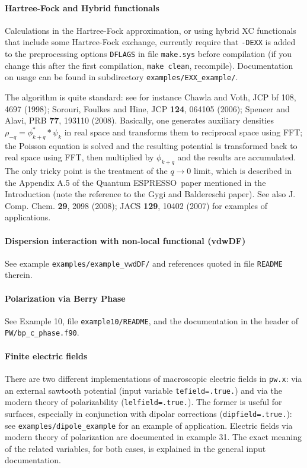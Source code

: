 \documentclass[12pt,a4paper]{article}
\def\qe{{\sc Quantum ESPRESSO}}
\def\pw.x{\texttt{pw.x}}
\begin{document}
\paragraph{Hartree-Fock and Hybrid functionals}

Calculations in the Hartree-Fock approximation, or using hybrid XC functionals 
that include some Hartree-Fock exchange, currently require that
\texttt{-DEXX} is added to the preprocessing options \texttt{DFLAGS} in file 
\texttt{make.sys} before compilation (if you change this after the first
compilation, \texttt{make clean}, recompile). 
Documentation on usage can be found in subdirectory 
\texttt{examples/EXX\_example/}.

The algorithm is quite standard: see for instance Chawla and Voth, 
JCP {bf 108}, 4697 (1998); Sorouri, Foulkes and Hine, JCP {\bf 124}, 
064105 (2006); Spencer and Alavi, PRB {\bf 77}, 193110 (2008). 
Basically, one generates auxiliary densities $\rho_{-q}=\phi^{*}_{k+q}*\psi_k$
in real space and transforms them to reciprocal space using FFT;
the Poisson equation is solved and the resulting potential is transformed 
back to real space using FFT, then multiplied by $\phi_{k+q}$ and the
results are accumulated.
The only tricky point is the treatment of the $q\rightarrow 0$ limit,
which is described in the Appendix A.5 of the \qe\ paper mentioned 
in the Introduction (note the reference to the Gygi and Baldereschi paper). 
See also J. Comp. Chem. {\bf 29}, 2098 (2008);
JACS {\bf 129}, 10402 (2007) for examples of applications.

\paragraph{Dispersion interaction with non-local functional (vdwDF)}
See example \texttt{examples/example\_vwdDF/} and references
quoted in file \texttt{README} therein.

\paragraph{Polarization via Berry Phase}
See Example 10, file \texttt{example10/README}, and the documentation 
in the header of \texttt{PW/bp\_c\_phase.f90}. 

\paragraph{Finite electric fields}
There are two different implementations of macroscopic electric fields
in \pw.x: via an external sawtooth potential (input variable
\texttt{tefield=.true.}) and via the modern theory of polarizability
(\texttt{lelfield=.true.}).
The former is useful for surfaces, especially in conjunction
with dipolar corrections (\texttt{dipfield=.true.}):
see \texttt{examples/dipole\_example} for an example of application. 
Electric fields via modern theory of polarization are documented in
example 31. The exact meaning of the related variables, for both
cases, is explained in the general input documentation.
\end{document}

